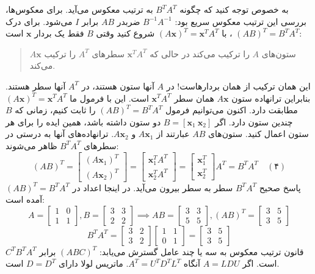 \documentclass[12pt, a4paper]{book}
\begin{document}
	به خصوص توجه کنید که چگونه $B^TA^T$ به ترتیب معکوس می‌آید. برای معکوس‌ها، بررسی این ترتیب معکوس سریع بود: $B^{-1}A^{-1}$ ضربدر $AB$ برابر $I$ می‌شود. برای درک $(AB)^T = B^TA^T$ ، با $(A\mathbf{x})^T = \mathbf{x}^TA^T$ شروع کنید وقتی $B$ فقط یک بردار $\mathbf{x}$ است:
	\begin{quote}
		$A\mathbf{x}$ ستون‌های $A$ را ترکیب می‌کند در حالی که $\mathbf{x}^TA^T$ سطرهای $A^T$ را ترکیب می‌کند.
	\end{quote}
	این همان ترکیب از همان بردارهاست! در $A$ آنها ستون هستند، در $A^T$ آنها سطر هستند. بنابراین ترانهاده ستون $A\mathbf{x}$ همان سطر $\mathbf{x}^TA^T$ است. این با فرمول ما $(A\mathbf{x})^T = \mathbf{x}^TA^T$ مطابقت دارد. اکنون می‌توانیم فرمول $(AB)^T = B^TA^T$ را ثابت کنیم، زمانی که $B$ چندین ستون دارد.
	اگر $B = [\mathbf{x}_1 \ \mathbf{x}_2]$ دو ستون داشته باشد، همین ایده را برای هر ستون اعمال کنید. ستون‌های $AB$ عبارتند از $A\mathbf{x}_1$ و $A\mathbf{x}_2$. ترانهاده‌های آنها به درستی در سطرهای $B^TA^T$ ظاهر می‌شوند:
	\[ (AB)^T = \begin{bmatrix} (A\mathbf{x}_1)^T \\ (A\mathbf{x}_2)^T \end{bmatrix} = \begin{bmatrix} \mathbf{x}_1^T A^T \\ \mathbf{x}_2^T A^T \end{bmatrix} = \begin{bmatrix} \mathbf{x}_1^T \\ \mathbf{x}_2^T \end{bmatrix} A^T = B^T A^T \quad (۴) \]
	پاسخ صحیح $B^TA^T$ سطر به سطر بیرون می‌آید. در اینجا اعداد در $(AB)^T = B^TA^T$ آمده است:
	\[ A = \begin{bmatrix} 1 & 0 \\ 1 & 1 \end{bmatrix}, B = \begin{bmatrix} 3 & 3 \\ 2 & 2 \end{bmatrix} \implies AB = \begin{bmatrix} 3 & 3 \\ 5 & 5 \end{bmatrix}, (AB)^T = \begin{bmatrix} 3 & 5 \\ 3 & 5 \end{bmatrix} \]
	\[ B^TA^T = \begin{bmatrix} 3 & 2 \\ 3 & 2 \end{bmatrix} \begin{bmatrix} 1 & 1 \\ 0 & 1 \end{bmatrix} = \begin{bmatrix} 3 & 5 \\ 3 & 5 \end{bmatrix} \]
	قانون ترتیب معکوس به سه یا چند عامل گسترش می‌یابد: $(ABC)^T$ برابر $C^TB^TA^T$ است.
	اگر $A=LDU$ آنگاه $A^T=U^TD^TL^T$. ماتریس لولا دارای $D=D^T$ است.
	
\end{document}
